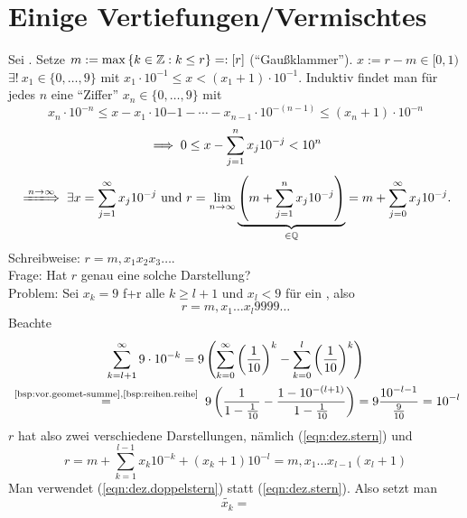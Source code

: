 \documentclass[12pt]{scrreprt}
\begin{document}
\begin{bsp}
  \label{bsp:reihen.wurzel-krit}

\end{bsp}

\section{Einige Vertiefungen/Vermischtes}
\label{sec:reihen.vermischtes}

\begin{bsp}[Dezimaldarstellung]
  \label{bsp:reihen.dez}
  Sei . Setze $m:=\max{\{k\in\ensuremath{\mathbb{Z}}:k\le r\}} =: [r]$
  ("`Gaußklammer"'). \folgt $x:=r-m \in [0,1)$ \folgt $\exists!\ x_1
  \in \{0,\dotsc,9\}$ mit $x_1\cdot10^{-1} \le x <
  (x_1+1)\cdot10^{-1}$.
  Induktiv findet man für jedes $n$ eine "`Ziffer"'
  $x_n\in\{0,\dotsc,9\}$ mit \[x_n\cdot10^{-n} \le
  x-x_1\cdot10{-1}-\dotsb-x_{n-1}\cdot10^{-(n-1)} \le
  (x_n+1)\cdot10^{-n}\]
  \[\implies 0 \le x - \sum_{j=1}^{n}{x_j10^{-j}}<10^n\]
  \[\folgtwegen{\ninf} \exists x=\sum_{j=1}^{\infty}x_j10^{-j} \text{
    und } r =
  \lim_{\ninf}{\underbrace{\left(m+\sum_{j=1}^n{x_j10^{-j}}\right)}_{\in\set{Q}}}=m+\sum_{j=0}^{\infty}{x_j10^{-j}}.\]
    Schreibweise: $r=m{,}x_1x_2x_3\dotsc$.\\
  Frage: Hat $r$ genau eine solche Darstellung?\\
  Problem: Sei $x_k=9$ f+r alle $k\ge l+1$ und $x_l<9$ für ein
  , also
  \begin{equation}
    \label{eqn:dez.stern}
    r=m{,}x_1\dotsc x_l9999\dotsc \tag{$*$}
  \end{equation}
  Beachte \begin{multline*}
    \sum_{k=l+1}^{\infty}{9\cdot10^{-k}} =
    9\left(\sum_{k=0}^{\infty}\left(\frac{1}{10}\right)^k-\sum_{k=0}^l\left(\frac{1}{10}\right)^k\right)
    \\\nach{=}{\ref{bsp:vor.geomet-summe},\ref{bsp:reihen.reihe}}
    9\left(\frac{1}{1-\frac{1}{10}}-\frac{1-10^{-(l+1)}}{1-\frac{1}{10}}\right)
    = 9\frac{10^{-l-1}}{\frac{9}{10}}=10^{-l}
  \end{multline*}
  $r$ hat also zwei verschiedene Darstellungen, nämlich
  (\ref{eqn:dez.stern}) und
  \begin{equation}
    \label{eqn:dez.doppelstern}
    r=m+\sum_{k=1}^{l-1}{x_k10^{-k}}+(x_k+1)10^{-l}=m{,}x_1\dotsc
    x_{l-1}(x_l+1) \tag{$**$}
  \end{equation}
  Man verwendet (\ref{eqn:dez.doppelstern}) statt
  (\ref{eqn:dez.stern}). Also setzt man
  \[\tilde{x_k}=
\]
\end{bsp}
\end{document}
